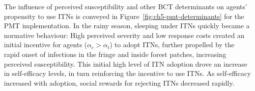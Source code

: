 \begin{figure}[hp!]
     \centering
    \label{fig:ch5-hbm-determinants}
\end{figure}

The influence of perceived susceptibility and other BCT determinants on agents' propensity to use ITNs is conveyed in Figure~\ref{fig:ch5-pmt-determinants} for the PMT implementation. In the rainy season, sleeping under ITNs quickly became a normative behaviour: High perceived severity and low response costs created an initial incentive for agents ($\alpha_c>\alpha_t$) to adopt ITNs, further propelled by the rapid onset of infections in the fringe and inside forest patches, increasing perceived susceptibility. This initial high level of ITN adoption drove an increase in self-efficacy levels, in turn reinforcing the incentive to use ITNs. As self-efficacy increased with adoption, social rewards for rejecting ITNs decreased rapidly.

